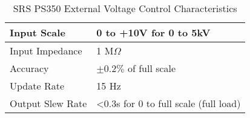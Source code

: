 \begin{table}
\begin{tabular}{| l | l | }
\hline
Input Scale      & 0 to +10V for 0 to 5kV                          \\ \hline
Input Impedance  & 1 M$\Omega$                                     \\ \hline
Accuracy         & $\pm 0.2\%$ of full scale                       \\ \hline
Update Rate      & 15 Hz                                           \\ \hline
Output Slew Rate & \textless 0.3s for 0 to full scale (full load)  \\ \hline
\end{tabular}
\caption{SRS PS350 External Voltage Control Characteristics}\cite{srsManual} \cite{srsCatalog}
\label{srsCtrl_table}
\end{table}
